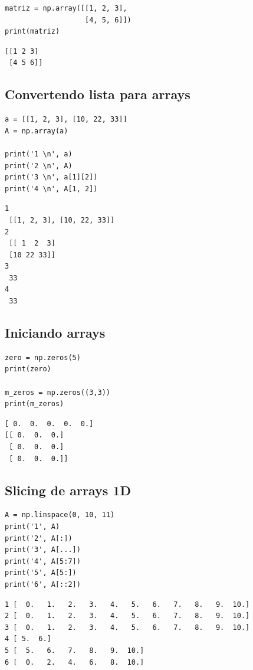 \documentclass[presentation]{beamer}
\begin{document}
\begin{verbatim}
matriz = np.array([[1, 2, 3],
                   [4, 5, 6]])
print(matriz)
\end{verbatim}

\begin{verbatim}
[[1 2 3]
 [4 5 6]]
\end{verbatim}


\subsection{Convertendo lista para arrays}
\label{sec:orgheadline8}

\begin{verbatim}
a = [[1, 2, 3], [10, 22, 33]]
A = np.array(a)

print('1 \n', a)
print('2 \n', A)
print('3 \n', a[1][2])
print('4 \n', A[1, 2])
\end{verbatim}

\begin{verbatim}
1 
 [[1, 2, 3], [10, 22, 33]]
2 
 [[ 1  2  3]
 [10 22 33]]
3 
 33
4 
 33
\end{verbatim}

\subsection{Iniciando arrays}
\label{sec:orgheadline9}

\begin{verbatim}
zero = np.zeros(5)
print(zero)

m_zeros = np.zeros((3,3))
print(m_zeros)
\end{verbatim}

\begin{verbatim}
[ 0.  0.  0.  0.  0.]
[[ 0.  0.  0.]
 [ 0.  0.  0.]
 [ 0.  0.  0.]]
\end{verbatim}
\subsection{Slicing de arrays 1D}
\label{sec:orgheadline10}

\begin{verbatim}
A = np.linspace(0, 10, 11)
print('1', A)
print('2', A[:])
print('3', A[...])
print('4', A[5:7])
print('5', A[5:])
print('6', A[::2])
\end{verbatim}

\begin{verbatim}
1 [  0.   1.   2.   3.   4.   5.   6.   7.   8.   9.  10.]
2 [  0.   1.   2.   3.   4.   5.   6.   7.   8.   9.  10.]
3 [  0.   1.   2.   3.   4.   5.   6.   7.   8.   9.  10.]
4 [ 5.  6.]
5 [  5.   6.   7.   8.   9.  10.]
6 [  0.   2.   4.   6.   8.  10.]
\end{verbatim}
\end{document}
